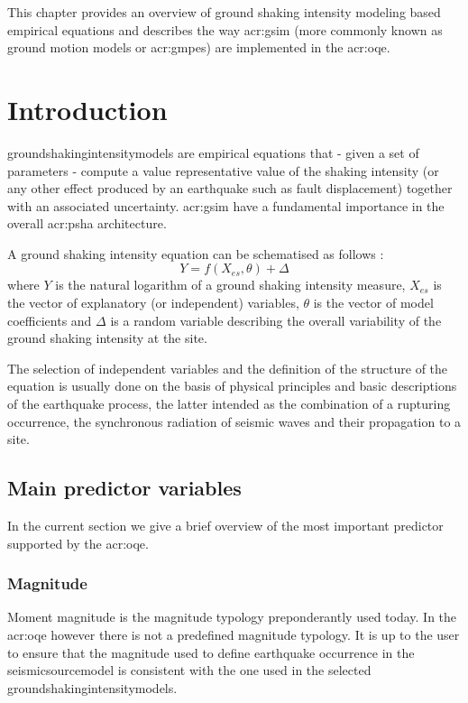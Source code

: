 This chapter provides an overview of ground shaking intensity modeling based 
empirical equations and describes the way \gls{acr:gsim} (more commonly 
known as ground motion models or \glspl{acr:gmpe}) are implemented in the 
\gls{acr:oqe}.
%
\section{Introduction}
%
\Glspl{groundshakingintensitymodel} are empirical equations that - given a 
set of parameters - compute a value representative value of the shaking 
intensity (or any other 
effect produced by an earthquake such as fault displacement) together with 
an associated uncertainty. 
%
\gls{acr:gsim} have a fundamental importance in the overall \gls{acr:psha} 
architecture.

A ground shaking intensity equation can be schematised as follows 
\parencite{alatik2010}: 
\begin{equation}
Y = f(X_{es},\theta)+\Delta
\end{equation}
where $Y$ is the natural logarithm of a ground shaking intensity measure, 
$X_{es}$ is the vector of explanatory (or independent) variables, $\theta$ 
is the vector of model coefficients and $\Delta$ is a random variable 
describing the overall variability of the ground shaking intensity at 
the site.

The selection of independent variables and the definition of the structure 
of the equation is usually done on the basis of physical principles and 
basic descriptions of the earthquake process, the latter
intended as the combination of a rupturing occurrence, the synchronous 
radiation of seismic waves and their propagation to a site.
%
\subsection{Main predictor variables}
In the current section we give a brief overview of the most important predictor 
supported by the \gls{acr:oqe}.
%
\subsubsection{Magnitude}
Moment magnitude \parencite{hanks1979} is the magnitude typology 
preponderantly used today. 
%
In the \gls{acr:oqe} however there is not a predefined magnitude typology.
It is up to the user to ensure that the magnitude used to define earthquake 
occurrence in the \gls{seismicsourcemodel} is consistent with the one used 
in the selected \glspl{groundshakingintensitymodel}.
%

